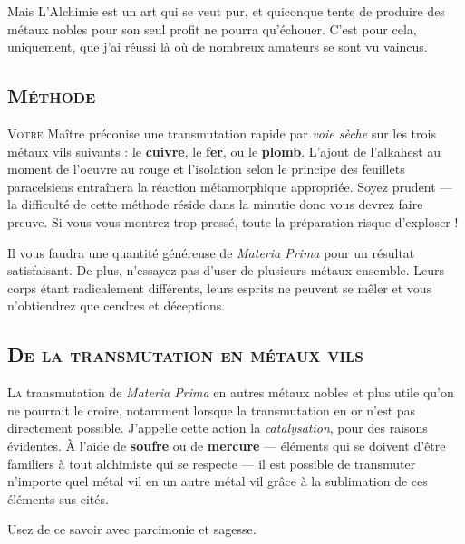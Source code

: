 Mais L'Alchimie est un art qui se veut pur, et quiconque tente de produire
des métaux nobles pour son seul profit ne pourra qu'échouer. C'est pour cela,
uniquement, que j'ai réussi là où de nombreux amateurs se sont vu vaincus.

\subsection{\textsc{Méthode}}

\lettrine{V}{otre} Maître préconise une transmutation rapide par \emph{voie sèche} sur
les trois métaux vils suivants : le \textbf{cuivre}, le \textbf{fer}, ou le
\textbf{plomb}. L'ajout de l'alkahest au moment de l'oeuvre au rouge et
l'isolation selon le principe des feuillets paracelsiens entraînera la réaction
métamorphique appropriée. Soyez prudent — la difficulté de cette méthode réside dans la
minutie donc vous devrez faire preuve. Si vous vous montrez trop pressé, toute
la préparation risque d'exploser !

Il vous faudra une quantité généreuse de \emph{Materia Prima} pour un résultat
satisfaisant. De plus, n'essayez pas d'user de plusieurs métaux ensemble. Leurs
corps étant radicalement différents, leurs esprits ne peuvent se mêler et vous
n'obtiendrez que cendres et déceptions.

\subsection{\textsc{De la transmutation en métaux vils}}

\lettrine{L}{a} transmutation de \emph{Materia Prima} en autres métaux nobles et plus utile
qu'on ne pourrait le croire, notamment lorsque la transmutation en or n'est pas
directement possible. J'appelle cette action la \emph{catalysation}, pour des
raisons évidentes. À l'aide de \textbf{soufre} ou de \textbf{mercure} —
éléments qui se doivent d'être familiers à tout alchimiste qui se respecte — il
est possible de transmuter n'importe quel métal vil en un autre métal vil grâce
à la sublimation de ces éléments sus-cités.


Usez de ce savoir avec parcimonie et sagesse.

\section{}


